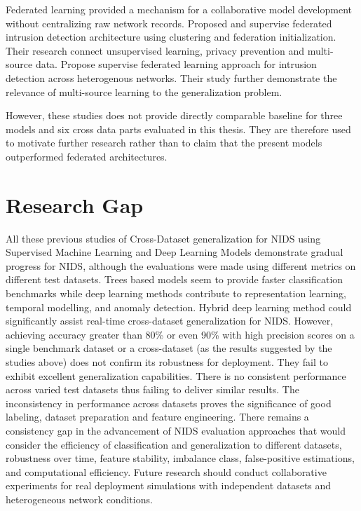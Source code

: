  Federated learning provided a mechanism for a collaborative model development without centralizing raw network records. \cite{Goarceyraud2025} 
 Proposed and supervise federated intrusion detection architecture using clustering and federation initialization. Their research connect unsupervised learning, privacy prevention and multi-source data.
 \cite{Bertolis2024} Propose supervise federated learning approach for intrusion detection across heterogenous networks. Their study further demonstrate the relevance of multi-source learning to the generalization problem.
 
 However, these studies does not provide directly comparable baseline for three models and six cross data parts evaluated in this thesis. They are therefore used to motivate further research rather than to claim that the present models outperformed federated architectures. 
 
\section{Research Gap}
All these previous studies of Cross-Dataset generalization for NIDS using Supervised Machine Learning and Deep Learning Models demonstrate gradual 
progress for NIDS, although the evaluations were made using different metrics on different test datasets. Trees based models seem to provide faster classification 
benchmarks while deep learning methods contribute to representation learning, temporal modelling, and anomaly detection. Hybrid deep learning method 
could significantly assist real-time cross-dataset generalization for NIDS. However, achieving accuracy greater than 80\% or even 90\% with high 
precision scores on a single benchmark dataset or a cross-dataset (as the results suggested by the studies above) does not confirm its robustness 
for deployment. They fail to exhibit excellent generalization capabilities. There is no consistent performance across varied test datasets thus failing
 to deliver similar results. The inconsistency in performance across datasets proves the significance of good labeling, dataset preparation and feature 
 engineering. There remains a consistency gap in the advancement of NIDS evaluation approaches that would consider the efficiency of classification and 
 generalization to different datasets, robustness over time, feature stability, imbalance class, false-positive estimations, and computational efficiency. 
 Future research should conduct collaborative experiments for real deployment simulations with independent datasets and heterogeneous network conditions.

